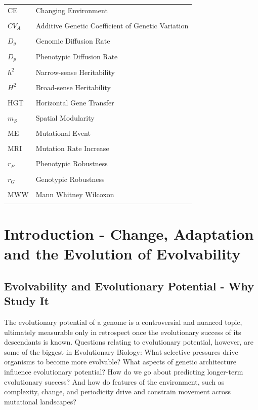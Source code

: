 \documentclass[PhD]{msu-thesis}
\begin{document}
\begin{table}[ht]
\begin{tabularx}{\textwidth}{lX}
{CE} & Changing Environment \\
\\
{$CV_A$} & Additive Genetic Coefficient of Genetic Variation \\
\\
{$D_g$} & Genomic Diffusion Rate \\
\\
{$D_p$} & Phenotypic Diffusion Rate \\
\\
{$h^2$} & Narrow-sense Heritability \\
\\
{$H^2$} & Broad-sense Heritability \\
\\
{HGT} & Horizontal Gene Transfer \\
\\
{$m_S$} & Spatial Modularity \\
\\
{ME} & Mutational Event \\
\\
{MRI} & Mutation Rate Increase \\
\\
{$r_P$} & Phenotypic Robustness \\
\\
{$r_G$} & Genotypic Robustness \\
\\
{MWW} & Mann Whitney Wilcoxon \\
\\

\end{tabularx}
\end{table}
%
\clearpage
\todototoc
\listoftodos
%
\mainmatter
\chapter{Introduction - Change, Adaptation and the Evolution of Evolvability}
\label{chap:introduction}
\section{Evolvability and Evolutionary Potential - Why Study It} 
The evolutionary potential of a genome is a controversial and nuanced topic, ultimately measurable only in retrospect once the evolutionary success of its descendants is known. Questions relating to evolutionary potential, however, are some of the biggest in Evolutionary Biology: What selective pressures drive organisms to become more evolvable? What aspects of genetic architecture influence evolutionary potential? How do we go about predicting longer-term evolutionary success? And how do features of the environment, such as complexity, change, and periodicity drive and constrain movement across mutational landscapes?
\end{document}
